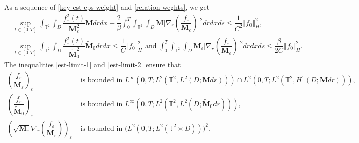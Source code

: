 \documentclass[a4paper,12pt, reqno]{amsart}
\begin{document}
As a sequence of \eqref{key-est-eps-weight} and \eqref{relation-weghts}, we get
\begin{align}
     &\sup_{t\in[0,T]}    \int_{\mathbb{T}^2}\int_D\dfrac{f_\varepsilon^2(t)}{\mathbf{M}_\varepsilon^2} \mathbf{M}drdx+\dfrac{2 }{\beta}\int_0^T\int_{\mathbb{T}^2}\int_D \mathbf{M}\vert \nabla_r(\dfrac{f_\varepsilon}{\mathbf{M}_\varepsilon})\vert^2 dr dx ds\leq \dfrac{1}{C^2}\Vert f_0\Vert_H^2,\label{est-limit-1}\\
      &\sup_{t\in[0,T]}    \int_{\mathbb{T}^2}\int_D\dfrac{f_\varepsilon^2(t)}{\widetilde{\mathbf{M}}_0^2} \widetilde{\mathbf{M}}_0drdx\leq \dfrac{1}{C}\Vert f_0\Vert_H^2 \text{ and } \int_0^T\int_{\mathbb{T}^2}\int_D \mathbf{M}_\varepsilon\vert \nabla_r(\dfrac{f_\varepsilon}{\mathbf{M}_\varepsilon})\vert^2 dr dx ds\leq \dfrac{\beta}{2C}\Vert f_0\Vert_H^2.  \label{est-limit-2}
\end{align}
The  inequalities \eqref{est-limit-1} and  \eqref{est-limit-2} ensure that 
\begin{align*}
(\dfrac{f_\varepsilon}{\mathbf{M}_\varepsilon})_\varepsilon  &\text{ is bounded in }  L^\infty(0, T;L^2(\mathbb{T}^2,L^2(D;\mathbf{M}dr)))\cap L^2(0, T;L^2(\mathbb{T}^2,H^1(D;\mathbf{M}dr))),\\
(\dfrac{f_\varepsilon}{ \widetilde{\mathbf{M}}_0})_\varepsilon  &\text{ is bounded in }  L^\infty(0, T;L^2(\mathbb{T}^2,L^2(D; \widetilde{\mathbf{M}}_0dr))),\\
(\sqrt{\mathbf{M}_\varepsilon}\nabla_r(\dfrac{f_\varepsilon}{\mathbf{M}_\varepsilon}))_\varepsilon&\text{ is bounded in }  \big(L^2(0, T;L^2(\mathbb{T}^2\times D))\big)^2.
\end{align*}
\end{document}
